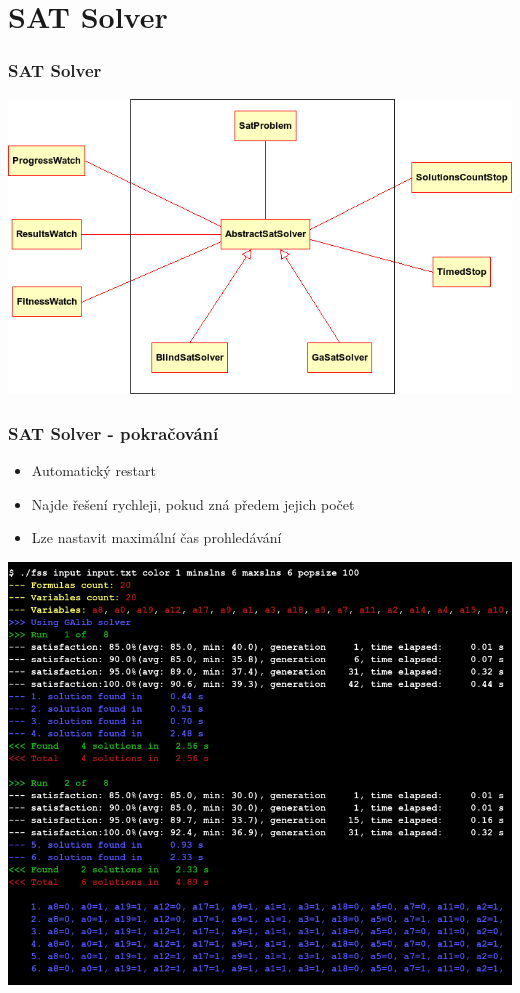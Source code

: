 \documentclass{beamer}
\begin{document}
\section{SAT Solver}
\begin{frame}
  \frametitle{SAT Solver}
  \includegraphics[scale=0.45]{AbstractSatSolver.png}
\end{frame}
\begin{frame}
  \frametitle{SAT Solver - pokračování}
  \begin{itemize}
   \item Automatický restart
   \medskip\item Najde řešení rychleji, pokud zná předem jejich počet
   \medskip\item Lze nastavit maximální čas prohledávání
  \end{itemize}
  \begin{flushright}
    \includegraphics[scale=0.2]{screenshot.png}
  \end{flushright}
\end{frame}
\end{document}
